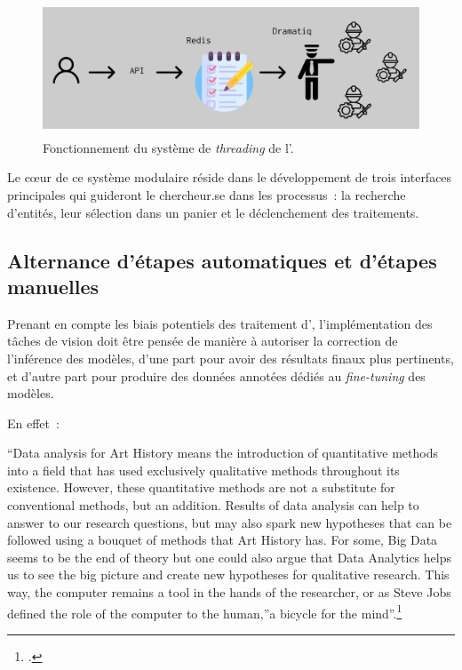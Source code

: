 \begin{figure}[H]
          \begin{center}
          \includegraphics[height=4cm]{figues/dramatiq.png}
          \end{center}
          \caption{Fonctionnement du système de \textit{threading} de l'\api.}
          \label{fig:dramatiq} \end{figure}

Le cœur de ce système modulaire réside dans le développement de trois
interfaces principales qui guideront le chercheur.se dans les processus~:
la recherche d'entités, leur sélection dans un panier et le
déclenchement des traitements.

\hypertarget{alternance-detapes-automatiques-et-detapes-manuelles}{%
\subsection{Alternance d'étapes automatiques et d'étapes
manuelles}\label{alternance-detapes-automatiques-et-detapes-manuelles}}

Prenant en compte les biais potentiels des traitement d'\ia,
l'implémentation des tâches de vision doit être pensée de manière à
autoriser la correction de l'inférence des modèles, d'une part pour
avoir des résultats finaux plus pertinents, et d'autre part pour
produire des données annotées dédiés au \emph{fine-tuning} des modèles.

En effet~:

\begin{kwote}
``Data analysis for Art History means the introduction of quantitative
methods into a field that has used exclusively qualitative methods
throughout its existence. However, these quantitative methods are not a
substitute for conventional methods, but an addition. Results of data
analysis can help to answer to our research questions, but may also
spark new hypotheses that can be followed using a bouquet of methods
that Art History has. For some, Big Data seems to be the end of theory
but one could also argue that Data Analytics helps us to see the big
picture and create new hypotheses for qualitative research. This way,
the computer remains a tool in the hands of the researcher, or as Steve
Jobs defined the role of the computer to the human,''a bicycle for the
mind''.\footcite[p.28]{klinke_big_2016}
\end{kwote}

